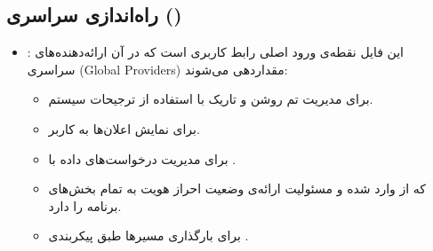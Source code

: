     \subsection{راه‌اندازی سراسری ()}
    \begin{itemize}
    	\item {}: این فایل نقطه‌ی ورود اصلی رابط کاربری است که در آن ارائه‌دهنده‌های سراسری (Global Providers) مقداردهی می‌شوند:
    	\begin{itemize}
    		\item {} برای مدیریت تم روشن و تاریک با استفاده از ترجیحات سیستم.
    		\item {} برای نمایش اعلان‌ها به کاربر.
    		\item {} برای مدیریت درخواست‌های داده با .
    		\item {} که از  وارد شده و مسئولیت ارائه‌ی وضعیت احراز هویت به تمام بخش‌های برنامه را دارد.
    		\item {} برای بارگذاری مسیرها طبق پیکربندی .
    	\end{itemize}
    \end{itemize}
    
